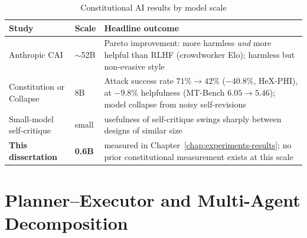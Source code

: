\begin{table}[H]
  \centering
  \caption{Constitutional AI results by model scale}
  \label{tab:cai-at-scale}
  \begin{tabular}{p{3.4cm}p{2.2cm}p{8.5cm}}
    \hline
    Study & Scale & Headline outcome \\
    \hline
    Anthropic CAI \cite{bai2022constitutionalaiharmlessnessai} & $\sim$52B &
      Pareto improvement: more harmless \emph{and} more helpful than RLHF
      (crowdworker Elo); harmless but non-evasive style \\
    Constitution or Collapse \cite{zhang2025constitutioncollapseexploringconstitutional} & 8B &
      Attack success rate $71\% \to 42\%$ ($-40.8\%$, HeX-PHI), at $-9.8\%$
      helpfulness (MT-Bench $6.05 \to 5.46$); model collapse from noisy
      self-revisions \\
    Small-model self-critique \cite{menke2025effectiveconstitutionalaismall} & small &
      usefulness of self-critique swings sharply between designs of similar size \\
    \textbf{This dissertation} & \textbf{0.6B} & measured in
      Chapter~\ref{chap:experiments-results}; no prior constitutional
      measurement exists at this scale \\
    \hline
  \end{tabular}
\end{table}

\section{Planner--Executor and Multi-Agent Decomposition}
\label{sec:sota-planner-executor}

